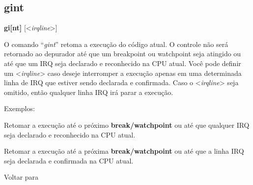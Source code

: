 \documentclass[letterpaper,10pt,brazil]{sphinxmanual}
\begin{document}
\subsection{gint}
\label{debugger/execution:debugger-command-gint}\label{debugger/execution:gint}
\begin{DUlineblock}{0em}
\item[]
\begin{DUlineblock}{\DUlineblockindent}
\item[] \textbf{gi{[}nt{]}} {[}\textless{}\emph{irqline}\textgreater{}{]}
\item[] 
\end{DUlineblock}
\item[] O comando ``\emph{gint}'' retoma a execução do código atual. O controle não será retornado ao depurador até que um breakpoint ou watchpoint seja atingido ou até que um IRQ seja declarado e reconhecido na CPU atual. Você pode definir um \textless{}\emph{irqline}\textgreater{} caso deseje interromper a execução apenas em uma determinada linha de IRQ que estiver sendo declarada e confirmada. Caso o \textless{}\emph{irqline}\textgreater{} seja omitido, então qualquer linha IRQ irá parar a execução.
\item[] 
\item[] Exemplos:
\item[] 
\item[]
\begin{DUlineblock}{\DUlineblockindent}
\item[] 
\item[] 
\end{DUlineblock}
\item[] Retomar a execução até o próximo \textbf{break/watchpoint} ou até que qualquer IRQ seja declarado e reconhecido na CPU atual.
\item[] 
\item[]
\begin{DUlineblock}{\DUlineblockindent}
\item[] 
\item[] 
\end{DUlineblock}
\item[] Retomar a execução até a próxima \textbf{break/watchpoint} ou até que a linha IRQ seja declarada e confirmada na CPU atual.
\item[] 
\item[] Voltar para {\hyperref[debugger/execution:debugger\string-execution\string-list]{}}
\end{DUlineblock}
\begin{quote}
\label{debugger/execution:debugger-command-gtime}\end{quote}
\end{document}
